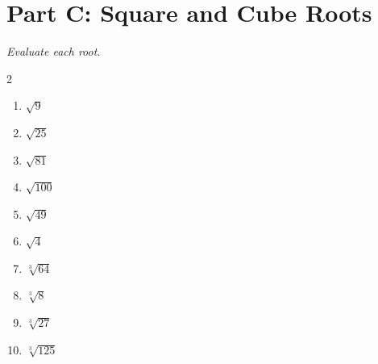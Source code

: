 \documentclass[11pt]{article}
\begin{document}
\section*{Part C: Square and Cube Roots}
\noindent\textit{Evaluate each root.}
\begin{multicols}{2}
\begin{enumerate}
  \item $\sqrt{9}$
  \vspace{1.1cm}
  \item $\sqrt{25}$
  \vspace{1.1cm}
  \item $\sqrt{81}$
  \vspace{1.1cm}
  \item $\sqrt{100}$
  \vspace{1.1cm}
  \item $\sqrt{49}$
  \vspace{1.1cm}
  \item $\sqrt{4}$
  \vspace{1.1cm}
  \item $\sqrt[3]{64}$
  \vspace{1.1cm}
  \item $\sqrt[3]{8}$
  \vspace{1.1cm}
  \item $\sqrt[3]{27}$
  \vspace{1.1cm}
  \item $\sqrt[3]{125}$
  \vspace{1.1cm}
\end{enumerate}
\end{multicols}
\end{document}
